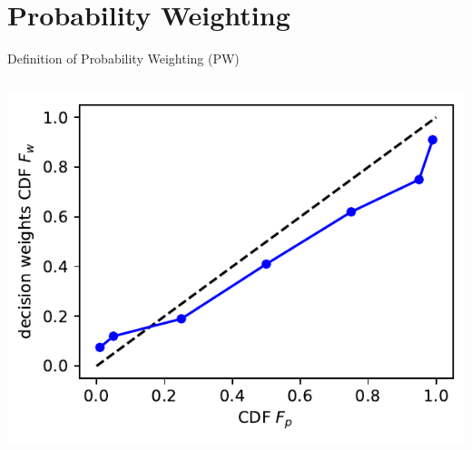 
\section{Probability Weighting}

\begin{frame}{Definition of Probability Weighting (PW)}

\begin{columns}%
{\centering	\includegraphics[width=.9\textwidth]{../figs/PB48_connectedDots.pdf} }
\parencite[p. 188, Fig. 1, relabelled axes]{PrestonBaratta1948} \\
\vspace{.5em}


\end{columns}
\end{frame}

